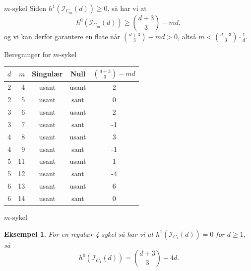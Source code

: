 \documentclass[UKenglish,aspectratio=169]{beamer}
\newtheorem{eksempel}{Eksempel}
\begin{document}
\begin{frame}{$m$-sykel}
    Siden $h^1(\mathcal{I}_{C_m}(d)) \geq 0$, så har vi at
    \[h^0(\mathcal{I}_{C_m}(d)) \geq \binom{d+3}{3} - md,\]
    og vi kan derfor garantere en flate når $\binom{d+3}{3} - md > 0$, altså $m < \binom{d+3}{3} \cdot \frac{1}{d}$.
\end{frame}

\begin{frame}[fragile]{Beregninger for $m$-sykel}
    \begin{table}
        \centering
        \small
        \begin{tabular}{r r c c c }
            \toprule
            $d$ & $m$ & Singulær & Null & $\binom{d+3}{3} - md$\\
            \midrule
            2 & 4  & usant & usant & 2 \\
            2 & 5  & usant & sant & 0  \\
            3 & 6  & usant & usant & 2 \\
            3 & 7  & usant & sant & -1  \\
            4 & 8  & usant & usant & 3 \\
            4 & 9  & usant & sant & -1  \\
            5 & 11 & usant & usant & 1 \\
            5 & 12 & usant & sant & -4  \\
            6 & 13 & usant & usant & 6 \\
            6 & 14 & usant & sant & 0  \\
            \bottomrule
        \end{tabular}
    \end{table}
\end{frame}

\begin{frame}{$m$-sykel}
    \begin{eksempel}
        For en regulær 4-sykel så har vi at $h^1(\mathcal{I}_{C_4}(d)) = 0$ for $d \geq 1$, så 
        \[h^0(\mathcal{I}_{C_4}(d)) = \binom{d+3}{3} - 4d.\] 
    \end{eksempel}
\end{frame}
\end{document}
